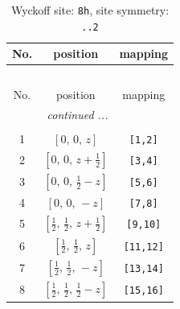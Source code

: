\documentclass[fleqn,8pt]{jsarticle}
\begin{document}
\begin{longtable}{ccc}
\caption{Wyckoff site: {\tt 8h}, site symmetry: {\tt ..2}}
 \\
 \hline \hline
No. & position & mapping \\ \hline \endfirsthead

\multicolumn{2}{l}{\tablename\ \thetable{}} \\
 \hline \hline
No. & position & mapping \\ \hline \endhead

 \hline \hline
\multicolumn{2}{r}{\footnotesize\it continued ...} \\ \endfoot

 \hline \hline
\multicolumn{2}{r}{} \\ \endlastfoot

1 & $\left[ 0,\, 0,\, z \right]$ & {\tt [1,2]} \\ \hline
2 & $\left[ 0,\, 0,\, z + \frac{1}{2} \right]$ & {\tt [3,4]} \\ \hline
3 & $\left[ 0,\, 0,\, \frac{1}{2} - z \right]$ & {\tt [5,6]} \\ \hline
4 & $\left[ 0,\, 0,\, - z \right]$ & {\tt [7,8]} \\ \hline
5 & $\left[ \frac{1}{2},\, \frac{1}{2},\, z + \frac{1}{2} \right]$ & {\tt [9,10]} \\ \hline
6 & $\left[ \frac{1}{2},\, \frac{1}{2},\, z \right]$ & {\tt [11,12]} \\ \hline
7 & $\left[ \frac{1}{2},\, \frac{1}{2},\, - z \right]$ & {\tt [13,14]} \\ \hline
8 & $\left[ \frac{1}{2},\, \frac{1}{2},\, \frac{1}{2} - z \right]$ & {\tt [15,16]} \\
\end{longtable}
\renewcommand{\arraystretch}{1.2}
\end{document}

